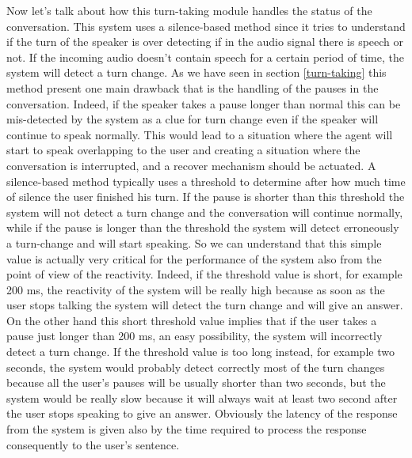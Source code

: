 \documentclass[../main.tex]{subfiles}
\begin{document}
Now let's talk about how this turn-taking module handles the status of the conversation. This system uses a silence-based method since it tries to understand if the turn of the speaker is over detecting if in the audio signal there is speech or not. If the incoming audio doesn't contain speech for a certain period of time, the system will detect a turn change. As we have seen in section \ref{turn-taking} this method present one main drawback that is the handling of the pauses in the conversation. Indeed, if the speaker takes a pause longer than normal this can be mis-detected by the system as a clue for turn change even if the speaker will continue to speak normally. This would lead to a situation where the agent will start to speak overlapping to the user and creating a situation where the conversation is interrupted, and a recover mechanism should be actuated. A silence-based method typically uses a threshold to determine after how much time of silence the user finished his turn. If the pause is shorter than this threshold the system will not detect a turn change and the conversation will continue normally, while if the pause is longer than the threshold the system will detect erroneously a turn-change and will start speaking. So we can understand that this simple value is actually very critical for the performance of the system also from the point of view of the reactivity. Indeed, if the threshold value is short, for example 200 ms, the reactivity of the system will be really high because as soon as the user stops talking the system will detect the turn change and will give an answer. On the other hand this short threshold value implies that if the user takes a pause just longer than 200 ms, an easy possibility, the system will incorrectly detect a turn change. If the threshold value is too long instead, for example two seconds, the system would probably detect correctly most of the turn changes because all the user's pauses will be usually shorter than two seconds, but the system would be really slow because it will always wait at least two second after the user stops speaking to give an answer. Obviously the latency of the response from the system is given also by the time required to process the response consequently to the user's sentence. 
\end{document}
